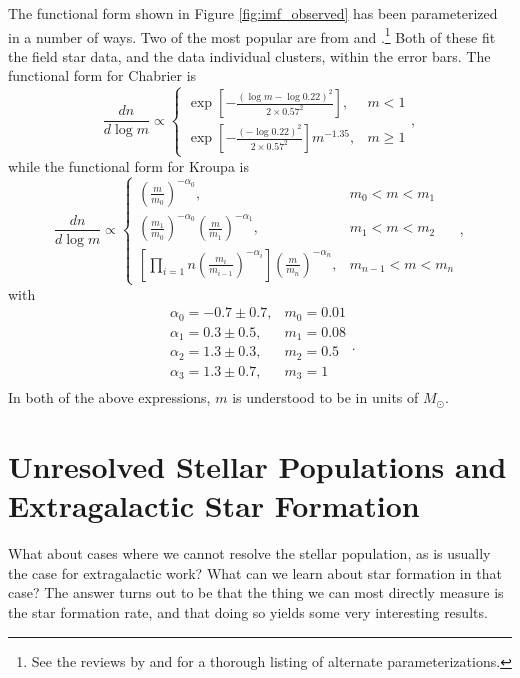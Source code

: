 The functional form shown in Figure \ref{fig:imf_observed} has been parameterized in a number of ways. Two of the most popular are from \citet{kroupa01a, kroupa02c} and \citet{chabrier03a, chabrier05a}.\footnote{See the reviews by \citet{bastian10a} and \citet{offner14a} for a thorough listing of alternate parameterizations.}  Both of these fit the field star data, and the data individual clusters, within the error bars. The functional form for Chabrier is
\begin{equation}
\label{eq:chabrier}
\frac{dn}{d\log m} \propto 
\left\{
\begin{array}{ll}
\exp\left[-\frac{(\log m-\log 0.22)^2}{2\times 0.57^2}\right], &
m<1 \\
\exp\left[-\frac{(-\log 0.22)^2}{2\times 0.57^2}\right] m^{-1.35}, &
m\ge 1
\end{array}
\right.,
\end{equation}
while the functional form for Kroupa is
\begin{equation}
\label{eq:kroupa}
\frac{dn}{d\log m} \propto
\left\{
\begin{array}{ll}
\left(\frac{m}{m_0}\right)^{-\alpha_0}, & m_0 < m < m_1\\
\left(\frac{m_1}{m_0}\right)^{-\alpha_0} \left(\frac{m}{m_1}\right)^{-\alpha_1}, &
m_1 < m < m_2 \\
\left[\prod_{i=1}{n} \left(\frac{m_i}{m_{i-1}}\right)^{-\alpha_i}\right] \left(\frac{m}{m_n}\right)^{-\alpha_n}, &
m_{n-1} < m < m_n
\end{array}
\right.,
\end{equation}
with
\begin{equation}
\begin{array}{ll}
\alpha_0 = -0.7\pm 0.7, & m_0 = 0.01 \\
\alpha_1 = 0.3\pm 0.5, & m_1 = 0.08 \\
\alpha_2 = 1.3\pm 0.3, & m_2 = 0.5 \\
\alpha_3 = 1.3\pm 0.7, & m_3 = 1 \\
\end{array}.
\end{equation}
In both of the above expressions, $m$ is understood to be in units of $M_\odot$.

\section{Unresolved Stellar Populations and Extragalactic Star Formation}

What about cases where we cannot resolve the stellar population, as is usually the case for extragalactic work? What can we learn about star formation in that case? The answer turns out to be that the thing we can most directly measure is the star formation rate, and that doing so yields some very interesting results.

